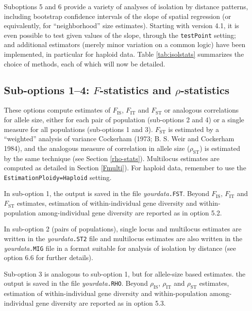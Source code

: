 \documentclass[
  12pt,
]{book}
\begin{document}
Suboptions 5 and 6 provide a variety of analyses of isolation by distance patterns, including bootstrap confidence intervals of the slope of spatial regression (or equivalently, for ``neighborhood'' size estimates). Starting with version 4.1, it is even possible to test given values of the slope, through the \texttt{testPoint} setting; and additional estimators (merely minor variation on a common logic) have been implemented, in particular for haploid data. Table \ref{tab:isolstats} summarizes the choice of methods, each of which will now be detailed.

\hypertarget{sub-options-14-f-statistics-and-rho-statistics}{%
\subsection{\texorpdfstring{Sub-options 1--4: \(F\)-statistics and \(\rho\)-statistics}{Sub-options 1--4: F-statistics and \textbackslash rho-statistics}}\label{sub-options-14-f-statistics-and-rho-statistics}}

These options compute estimates of \(F_\mathrm{IS}\), \(F_\mathrm{IT}\) and \(F_\mathrm{ST}\) or analogous correlations for allele size, either for each pair of population (sub-options 2 and 4) or a single measure for all populations (sub-options 1 and 3). \(F_\mathrm{ST}\) is estimated by a ``weighted'' analysis of variance Cockerham (1973; B. S. Weir and Cockerham 1984), and the analogous measure of correlation in allele size (\(\rho_\mathrm{ST}\)) is estimated by the same technique (see Section \ref{rho-stats}). Multilocus estimates are computed as detailed in Section \ref{Fmulti}). For haploid data, remember to use the \texttt{EstimationPloidy=Haploid} setting.

In sub-option 1, the output is saved in the file \emph{yourdata}\texttt{.FST}. Beyond \(F_\mathrm{IS}\), \(F_\mathrm{IT}\) and \(F_\mathrm{ST}\) estimates, estimation of within-individual gene diversity and within-population among-individual gene diversity are reported as in option 5.2.

In sub-option 2 (pairs of populations), single locus and multilocus estimates are written in the \emph{yourdata}\texttt{.ST2} file and multilocus estimates are also written in the \emph{yourdata}\texttt{.MIG} file in a format suitable for analysis of isolation by distance (see option 6.6 for further details).

Sub-option 3 is analogous to sub-option 1, but for allele-size based estimates. the output is saved in the file \emph{yourdata}\texttt{.RHO}. Beyond \(\rho_\mathrm{IS}\), \(\rho_\mathrm{IT}\) and \(\rho_\mathrm{ST}\) estimates, estimation of within-individual gene diversity and within-population among-individual gene diversity are reported as in option 5.3.
\end{document}
